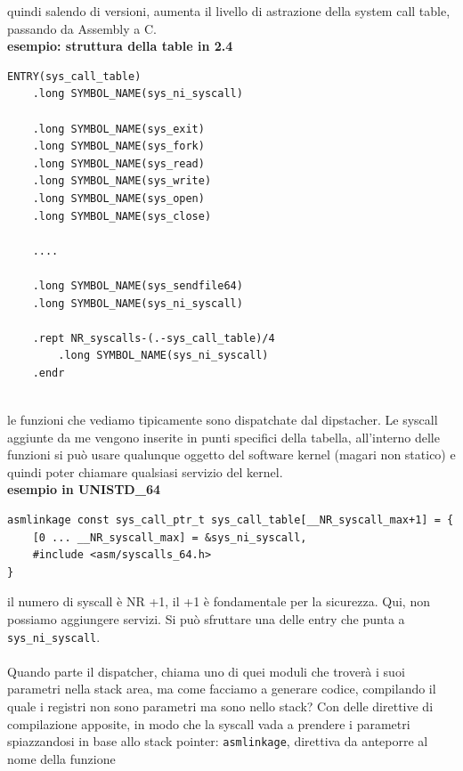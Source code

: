 \documentclass[12pt, oneside]{extbook}
\begin{document}
quindi salendo di versioni, aumenta il livello di astrazione della system call table, passando da Assembly a C.\\
\textbf{esempio: struttura della table in 2.4}\\
\begin{lstlisting}
ENTRY(sys_call_table)
	.long SYMBOL_NAME(sys_ni_syscall)
	
	.long SYMBOL_NAME(sys_exit)
	.long SYMBOL_NAME(sys_fork)
	.long SYMBOL_NAME(sys_read)
	.long SYMBOL_NAME(sys_write)
	.long SYMBOL_NAME(sys_open)
	.long SYMBOL_NAME(sys_close)
	
	....
	
	.long SYMBOL_NAME(sys_sendfile64)
	.long SYMBOL_NAME(sys_ni_syscall)
	
	.rept NR_syscalls-(.-sys_call_table)/4
		.long SYMBOL_NAME(sys_ni_syscall)
	.endr
	
\end{lstlisting}
le funzioni che vediamo tipicamente sono dispatchate dal dipstacher. Le syscall aggiunte da me vengono inserite in punti specifici della tabella, all'interno delle funzioni si può usare qualunque oggetto del software kernel (magari non statico) e quindi poter chiamare qualsiasi servizio del kernel.\\
\textbf{esempio in UNISTD\_64}\\
\begin{lstlisting}
asmlinkage const sys_call_ptr_t sys_call_table[__NR_syscall_max+1] = {
	[0 ... __NR_syscall_max] = &sys_ni_syscall,
	#include <asm/syscalls_64.h>
}
\end{lstlisting}
il numero di syscall è NR +1, il +1 è fondamentale per la sicurezza. Qui, non possiamo aggiungere servizi. Si può sfruttare una delle entry che punta a \texttt{sys\_ni\_syscall}.\\\\ Quando parte il dispatcher, chiama uno di quei moduli che troverà i suoi parametri nella stack area, ma come facciamo a generare codice, compilando il quale i registri non sono parametri ma sono nello stack? Con delle direttive di compilazione apposite, in modo che la syscall vada a prendere i parametri spiazzandosi in base allo stack pointer: \texttt{asmlinkage}, direttiva da anteporre al nome della funzione
\end{document}
